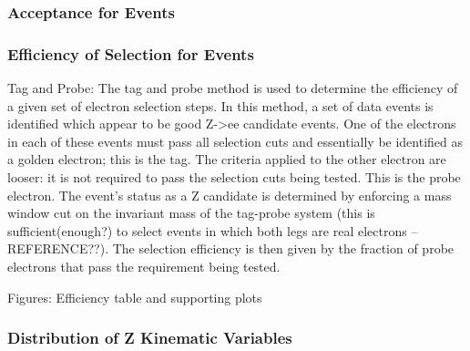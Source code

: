 \subsubsection{Acceptance for \Zee Events}
\subsubsection{Efficiency of Selection for \Zee Events}
Tag and Probe:  The tag and probe method is used to determine the efficiency of a given set of electron selection steps.  
In this method, a set of data events is identified which appear to be good Z->ee candidate events.  
One of the electrons in each of these events must pass 
all selection cuts and essentially be identified as a golden electron; 
this is the tag.  
The criteria applied to the other electron are looser: it is not required to pass the selection cuts being tested.  
This is the probe electron.  
The event's status as a Z candidate is determined by enforcing a mass window cut on the invariant mass of the tag-probe system 
(this is sufficient(enough?) to select events in which both legs are real electrons -- REFERENCE??).  
The selection efficiency is then given by the fraction of probe electrons that pass the requirement being tested.  

Figures: Efficiency table and supporting plots

\subsubsection{Distribution of Z Kinematic Variables}
